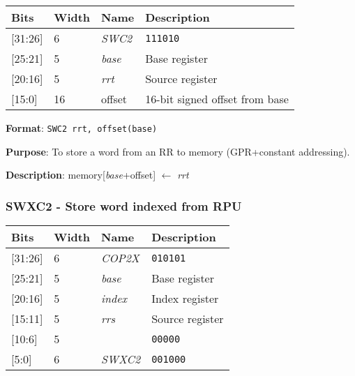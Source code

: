 \documentclass[11pt]{article}
\begin{document}
\begin{table}[H] \centering
  \def\arraystretch{1.4}
  \begin{tabular}{|m{2cm}|m{1.5cm}|m{2.5cm}|m{4.5cm}|}
    \hline
    \textbf{Bits} & \textbf{Width} & \textbf{Name} & \textbf{Description}\\ \hline

    [31:26] & 6 & \emph{SWC2} & \texttt{111010}\\ \hline

    [25:21] & 5 & \emph{base} & Base register\\ \hline

    [20:16] & 5 & \emph{rrt} & Source register\\ \hline

    [15:0] & 16 & offset & 16-bit signed offset from base\\ \hline
  \end{tabular}
\end{table}

\textbf{Format}: \texttt{SWC2 rrt, offset(base)}

\textbf{Purpose}: To store a word from an RR to memory (GPR+constant addressing).

\textbf{Description}: memory[\emph{base}+offset] $\leftarrow$ \emph{rrt}

\text{}
\subsubsection{SWXC2 - Store word indexed from RPU}
\text{}

\begin{table}[H] \centering
  \def\arraystretch{1.4}
  \begin{tabular}{|m{2cm}|m{1.5cm}|m{2.5cm}|m{4.5cm}|}
    \hline
    \textbf{Bits} & \textbf{Width} & \textbf{Name} & \textbf{Description}\\ \hline

    [31:26] & 6 & \emph{COP2X} & \texttt{010101}\\ \hline

    [25:21] & 5 & \emph{base} & Base register\\ \hline

    [20:16] & 5 & \emph{index} & Index register\\ \hline

    [15:11] & 5 & \emph{rrs} & Source register\\ \hline

    [10:6] & 5 & & \texttt{00000}\\ \hline

    [5:0] & 6 & \emph{SWXC2} & \texttt{001000}\\ \hline
  \end{tabular}
\end{table}
\end{document}

